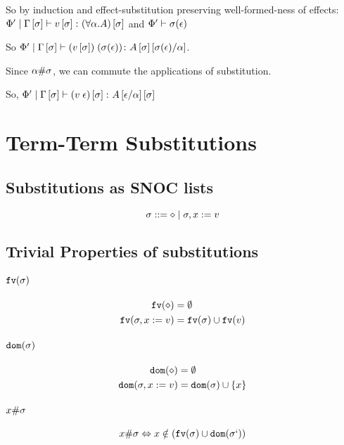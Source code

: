 {    So by induction and effect-substitution preserving well-formed-ness of effects: $\Phi'\mid\Gamma\left[\sigma\right] \vdash v\left[\sigma\right] \colon (\forall \alpha. A)\left[\sigma\right]$ and $\Phi'\vdash \sigma(\epsilon)$

    So $\Phi'\mid\Gamma\left[\sigma\right] \vdash (v\left[\sigma\right])\;(\sigma(\epsilon)) \colon A\left[\sigma\right]\left[\sigma(\epsilon) / \alpha\right]$.

    Since $\alpha\#\sigma$, we can commute the applications of substitution. 

    So, $\Phi'\mid\Gamma\left[\sigma\right] \vdash (v\;\epsilon)\left[\sigma\right] \colon A\left[\epsilon / \alpha\right]\left[\sigma\right]$

    \section{Term-Term Substitutions}



    \subsection{Substitutions as SNOC lists}

    \begin{equation}
       \sigma ::= \diamond \mid \sigma, x := v
    \end{equation}

    \subsection{Trivial Properties of substitutions}
    \paragraph{$\texttt{fv}(\sigma)$}
    \begin{align}
        \texttt{fv}(\diamond) &= \emptyset\\
        \texttt{fv}(\sigma, x:= v) &= \texttt{fv}(\sigma)\cup\texttt{fv}(v)
    \end{align}
    \paragraph{$\texttt{dom}(\sigma)$}
    \begin{align}
        \texttt{dom}(\diamond) & = \emptyset\\
        \texttt{dom}(\sigma, x:= v) & = \texttt{dom}(\sigma)\cup\left\{x\right\}
    \end{align}

    \paragraph{$x \# \sigma$}
    \begin{equation}
        x \# \sigma \Leftrightarrow x\notin(\texttt{fv}(\sigma)\cup\texttt{dom}(\sigma`))
    \end{equation}

}
